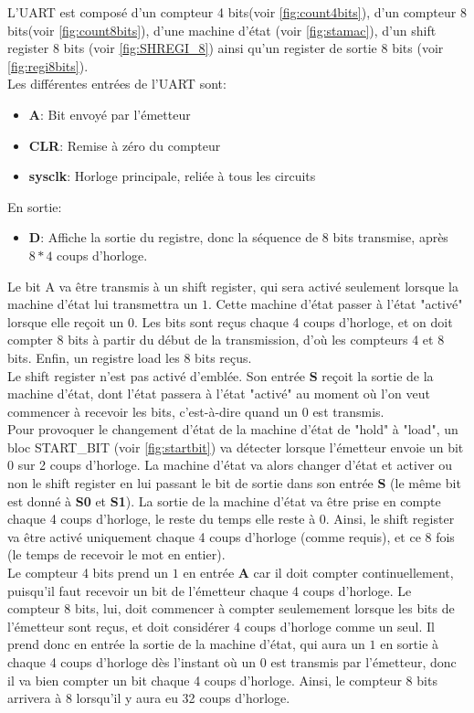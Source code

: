 \documentclass[a4paper]{article} %
\begin{document}
\begin{tcolorbox}[colframe=Monokaimagenta,colback=white]
L'UART est composé d'un compteur 4 bits(voir \ref{fig:count4bits}), d'un compteur 8 bits(voir \ref{fig:count8bits}), d'une machine d'état (voir \ref{fig:stamac}), d'un shift register 8 bits (voir \ref{fig:SHREGI_8}) ainsi qu'un register de sortie 8 bits (voir \ref{fig:regi8bits}).\\
Les différentes entrées de l'UART sont:
\begin{itemize}
    \item     \textbf{A}: Bit envoyé par l'émetteur
    \item     \textbf{CLR}: Remise à zéro du compteur
    \item     \textbf{sysclk}: Horloge principale, reliée à tous les circuits
\end{itemize}
En sortie:
\begin{itemize}
    \item     \textbf{D}: Affiche la sortie du registre, donc la séquence de 8 bits transmise, après $8*4$ coups d'horloge.
\end{itemize}
Le bit A va être transmis à un shift register, qui sera activé seulement lorsque la machine d'état lui transmettra un $1$. Cette machine d'état passer à l'état "activé" lorsque elle reçoit un 0. Les bits sont reçus chaque 4 coups d'horloge, et on doit compter 8 bits à partir du début de la transmission, d'où les compteurs 4 et 8 bits. Enfin, un registre load les 8 bits reçus.\\
Le shift register n'est pas activé d'emblée. Son entrée \textbf{S} reçoit la sortie de la machine d'état, dont l'état passera à l'état "activé" au moment où l'on veut commencer à recevoir les bits, c'est-à-dire quand un $0$ est transmis.\\
Pour provoquer le changement d'état de la machine d'état de "hold" à "load", un bloc START\_BIT (voir \ref{fig:startbit}) va détecter lorsque l'émetteur envoie un bit $0$ sur 2 coups d'horloge. La machine d'état va alors changer d'état et activer ou non le shift register en lui passant le bit de sortie dans son entrée \textbf{S} (le même bit est donné à \textbf{S0} et \textbf{S1}). La sortie de la machine d'état va être prise en compte chaque 4 coups d'horloge, le reste du temps elle reste à 0. Ainsi, le shift register va être activé uniquement chaque 4 coups d'horloge (comme requis), et ce 8 fois (le temps de recevoir le mot en entier).\\
Le compteur 4 bits prend un $1$ en entrée \textbf{A} car il doit compter continuellement, puisqu'il faut recevoir un bit de l'émetteur chaque 4 coups d'horloge. Le compteur 8 bits, lui, doit commencer à compter seulemement lorsque les bits de l'émetteur sont reçus, et doit considérer 4 coups d'horloge comme un seul. Il prend donc en entrée la sortie de la machine d'état, qui aura un $1$ en sortie à chaque 4 coups d'horloge dès l'instant où un 0 est transmis par l'émetteur, donc il va bien compter un bit chaque 4 coups d'horloge. Ainsi, le compteur 8 bits arrivera à 8 lorsqu'il y aura eu 32 coups d'horloge.\\

\end{tcolorbox}
\end{document}
